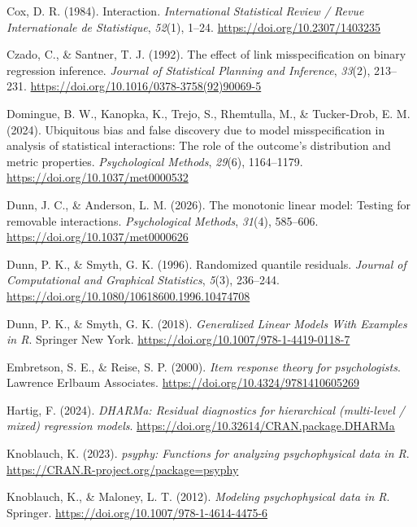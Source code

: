 \documentclass[
  man,
  floatsintext,
  longtable,
  nolmodern,
  notxfonts,
  notimes,
  colorlinks=true,linkcolor=blue,citecolor=blue,urlcolor=blue]{apa7}
\newlength{\cslhangindent}
\newenvironment{CSLReferences}[2] %
 {\begin{list}{}{%
  \setlength{\itemindent}{0pt}
  \setlength{\leftmargin}{0pt}
  \setlength{\parsep}{0pt}
  \ifodd #1
   \setlength{\leftmargin}{\cslhangindent}
   \setlength{\itemindent}{-1\cslhangindent}
  \fi
  \setlength{\itemsep}{#2\baselineskip}}}
 {\end{list}}
\begin{document}
\begin{CSLReferences}{1}{0}
Cox, D. R. (1984). Interaction. \emph{International Statistical Review /
Revue Internationale de Statistique}, \emph{52}(1), 1--24.
\url{https://doi.org/10.2307/1403235}

Czado, C., \& Santner, T. J. (1992). The effect of link misspecification
on binary regression inference. \emph{Journal of Statistical Planning
and Inference}, \emph{33}(2), 213--231.
\url{https://doi.org/10.1016/0378-3758(92)90069-5}

Domingue, B. W., Kanopka, K., Trejo, S., Rhemtulla, M., \& Tucker-Drob,
E. M. (2024). Ubiquitous bias and false discovery due to model
misspecification in analysis of statistical interactions: The role of
the outcome{'}s distribution and metric properties. \emph{Psychological
Methods}, \emph{29}(6), 1164--1179.
\url{https://doi.org/10.1037/met0000532}

Dunn, J. C., \& Anderson, L. M. (2026). The monotonic linear model:
Testing for removable interactions. \emph{Psychological Methods},
\emph{31}(4), 585--606. \url{https://doi.org/10.1037/met0000626}

Dunn, P. K., \& Smyth, G. K. (1996). Randomized quantile residuals.
\emph{Journal of Computational and Graphical Statistics}, \emph{5}(3),
236--244. \url{https://doi.org/10.1080/10618600.1996.10474708}

Dunn, P. K., \& Smyth, G. K. (2018). \emph{Generalized {Linear Models
With Examples} in {R}}. Springer New York.
\url{https://doi.org/10.1007/978-1-4419-0118-7}

Embretson, S. E., \& Reise, S. P. (2000). \emph{Item response theory for
psychologists}. Lawrence Erlbaum Associates.
\url{https://doi.org/10.4324/9781410605269}

Hartig, F. (2024). \emph{{DHARMa}: Residual diagnostics for hierarchical
(multi-level / mixed) regression models}.
\url{https://doi.org/10.32614/CRAN.package.DHARMa}

Knoblauch, K. (2023). \emph{{psyphy}: Functions for analyzing
psychophysical data in {R}}.
\url{https://CRAN.R-project.org/package=psyphy}

Knoblauch, K., \& Maloney, L. T. (2012). \emph{Modeling psychophysical
data in {R}}. Springer. \url{https://doi.org/10.1007/978-1-4614-4475-6}


\end{CSLReferences}
\end{document}
